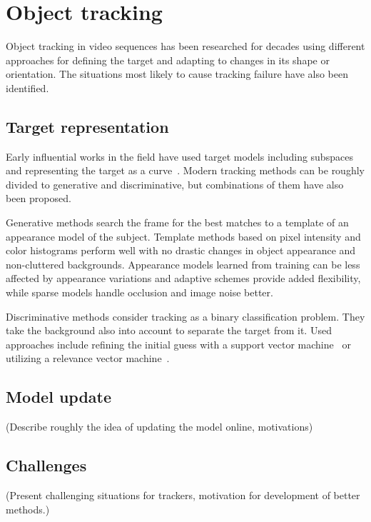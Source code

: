 \section{Object tracking}
Object tracking in video sequences has been researched for decades using different
approaches for defining the target and adapting to changes in its shape or orientation.
The situations most likely to cause tracking failure have also been identified.

\subsection{Target representation}
Early influential works in the field have used target models including subspaces
~\cite{EIGENTRACK} and representing the target as a curve~\cite{CONDENSATION}. Modern
tracking methods can be roughly divided to generative and discriminative, but combinations
of them have also been proposed. 

Generative methods search the frame for the best matches to a template of an appearance
model of the subject. Template methods based on pixel intensity and color histograms
perform well with no drastic changes in object appearance and non-cluttered backgrounds.
Appearance models learned from training can be less affected by appearance variations
and adaptive schemes provide added flexibility, while sparse models handle occlusion
and image noise better.~\cite{OBJECT_PLS}

Discriminative methods consider tracking as a binary classification problem. They take
the background also into account to separate the target from it. Used approaches
include refining the initial guess with a support vector machine~\cite{SVT} or utilizing
a relevance vector machine~\cite{SPARSE_BAYESIAN}.

\subsection{Model update}
(Describe roughly the idea of updating the model online, motivations)

\subsection{Challenges}
(Present challenging situations for trackers, motivation for development of better
methods.)
